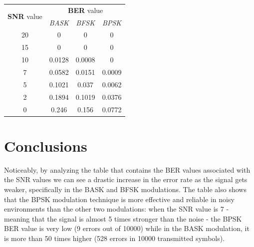 \begin{table}[h!]
    \centering
    \renewcommand{\arraystretch}{1.5}
    \begin{tabular}{|c|c c c|}
        \hline
        \multirow{2}{*}{\textbf{SNR} value} &  \multicolumn{3}{c|}{\textbf{BER} value} \\
        & \textsl{BASK} & \textsl{BFSK} & \textsl{BPSK} \\\hline\hline
        20 & 0 & 0 & 0 \\
        15 & 0 & 0 & 0 \\
        10 & 0.0128 & 0.0008 & 0 \\
        7 & 0.0582 & 0.0151 & 0.0009 \\
        5 & 0.1021 & 0.037 & 0.0062 \\
        2 & 0.1894 & 0.1019 & 0.0376 \\
        0 & 0.246 & 0.156 & 0.0772 \\\hline

    \end{tabular}
    \renewcommand{\arraystretch}{1}
\end{table}

\FloatBarrier\section*{Conclusions}
Noticeably, by analyzing the table that contains the BER values associated with the SNR values we can see a drastic increase in the error rate as the signal gets weaker, specifically in the BASK and BFSK modulations. The table also shows that the BPSK modulation technique is more effective and reliable in noisy environments than the other two modulations: when the SNR value is 7 - meaning that the signal is almost 5 times stronger than the noise - the BPSK BER value is very low (9 errors out of 10000) while in the BASK modulation, it is more than 50 times higher (528 errors in 10000 transmitted symbols).



